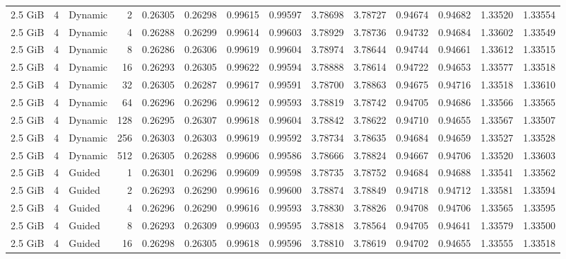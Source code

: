 \begin{table}[H]
\begin{adjustbox}{width=\textwidth, keepaspectratio}
\begin{tabular}{rrlrrrrrrrrrrr}
                    2.5 GiB & 4 & Dynamic & 2 & 0.26305 & 0.26298 & 0.99615 & 0.99597 & 3.78698 & 3.78727 & 0.94674 & 0.94682 & 1.33520 & 1.33554 \\
                    2.5 GiB & 4 & Dynamic & 4 & 0.26288 & 0.26299 & 0.99614 & 0.99603 & 3.78929 & 3.78736 & 0.94732 & 0.94684 & 1.33602 & 1.33549 \\
                    2.5 GiB & 4 & Dynamic & 8 & 0.26286 & 0.26306 & 0.99619 & 0.99604 & 3.78974 & 3.78644 & 0.94744 & 0.94661 & 1.33612 & 1.33515 \\
                    2.5 GiB & 4 & Dynamic & 16 & 0.26293 & 0.26305 & 0.99622 & 0.99594 & 3.78888 & 3.78614 & 0.94722 & 0.94653 & 1.33577 & 1.33518 \\
                    2.5 GiB & 4 & Dynamic & 32 & 0.26305 & 0.26287 & 0.99617 & 0.99591 & 3.78700 & 3.78863 & 0.94675 & 0.94716 & 1.33518 & 1.33610 \\
                    2.5 GiB & 4 & Dynamic & 64 & 0.26296 & 0.26296 & 0.99612 & 0.99593 & 3.78819 & 3.78742 & 0.94705 & 0.94686 & 1.33566 & 1.33565 \\
                    2.5 GiB & 4 & Dynamic & 128 & 0.26295 & 0.26307 & 0.99618 & 0.99604 & 3.78842 & 3.78622 & 0.94710 & 0.94655 & 1.33567 & 1.33507 \\
                    2.5 GiB & 4 & Dynamic & 256 & 0.26303 & 0.26303 & 0.99619 & 0.99592 & 3.78734 & 3.78635 & 0.94684 & 0.94659 & 1.33527 & 1.33528 \\
                    2.5 GiB & 4 & Dynamic & 512 & 0.26305 & 0.26288 & 0.99606 & 0.99586 & 3.78666 & 3.78824 & 0.94667 & 0.94706 & 1.33520 & 1.33603 \\
                    2.5 GiB & 4 & Guided & 1 & 0.26301 & 0.26296 & 0.99609 & 0.99598 & 3.78735 & 3.78752 & 0.94684 & 0.94688 & 1.33541 & 1.33562 \\
                    2.5 GiB & 4 & Guided & 2 & 0.26293 & 0.26290 & 0.99616 & 0.99600 & 3.78874 & 3.78849 & 0.94718 & 0.94712 & 1.33581 & 1.33594 \\
                    2.5 GiB & 4 & Guided & 4 & 0.26296 & 0.26290 & 0.99616 & 0.99593 & 3.78830 & 3.78826 & 0.94708 & 0.94706 & 1.33565 & 1.33595 \\
                    2.5 GiB & 4 & Guided & 8 & 0.26293 & 0.26309 & 0.99603 & 0.99595 & 3.78818 & 3.78564 & 0.94705 & 0.94641 & 1.33579 & 1.33500 \\
                    2.5 GiB & 4 & Guided & 16 & 0.26298 & 0.26305 & 0.99618 & 0.99596 & 3.78810 & 3.78619 & 0.94702 & 0.94655 & 1.33555 & 1.33518 \\

\end{tabular}
\end{adjustbox}
\end{table}
